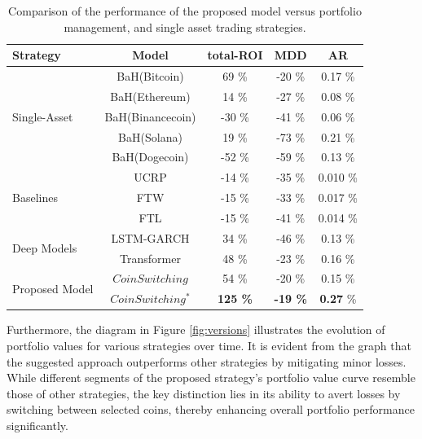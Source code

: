 \begin{table}[h]
	\centering
	\caption{Comparison of the performance of the proposed model versus portfolio management, and single asset trading strategies.}
	\label{tbl:cmp}
	\begin{tabular}{l| c | c | c | c  }
		Strategy & Model & total-ROI & MDD & AR \\
		\hline
		\hline
		\multirow{5}{*}{Single-Asset} 	& BaH(Bitcoin) & 69 \%  & -20 \% & 0.17 \% \\
										& BaH(Ethereum) & 14 \%  & -27 \% & 0.08  \% \\
										& BaH(Binancecoin) & -30 \%  & -41 \% & 0.06  \% \\
										& BaH(Solana) & 19 \%  & -73 \% & 0.21 \% \\
										& BaH(Dogecoin) & -52 \%  & -59 \% & 0.13  \% \\
		\hline
		\hline
		\multirow{3}{*}{Baselines} 	& UCRP & -14 \%  & -35 \% & 0.010 \% \\
												& FTW & -15 \%  & -33 \% & 0.017  \% \\
												& FTL & -15 \%  & -41 \% & 0.014  \% \\
		\hline
		\hline
		\multirow{2}{*}{Deep Models} 	& LSTM-GARCH & 34 \%  & -46 \% & 0.13 \% \\
									& Transformer & 48 \%  & -23 \% & 0.16  \% \\
		\hline
		\hline
		\multirow{2}{*}{Proposed Model}  	& $CoinSwitching$ &  54 \%  & -20 \%  & 0.15 \%\\
											& $CoinSwitching^*$ & \textbf{125 \%}  & \textbf{-19 \%} & \textbf{0.27}  \% \\
	\end{tabular}
\end{table}

Furthermore, the diagram in Figure \ref{fig:versions} illustrates the evolution of portfolio values for various strategies over time. It is evident from the graph that the suggested approach outperforms other strategies by mitigating minor losses. While different segments of the proposed strategy's portfolio value curve resemble those of other strategies, the key distinction lies in its ability to avert losses by switching between selected coins, thereby enhancing overall portfolio performance significantly.

